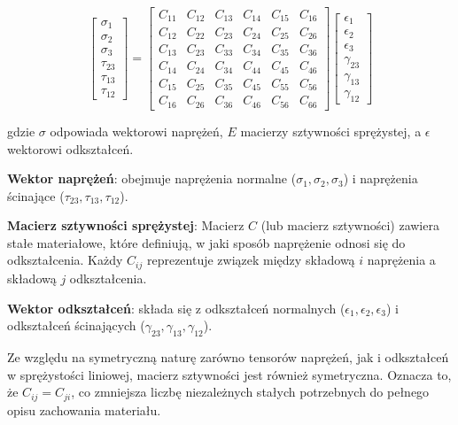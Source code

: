 $$
\begin{bmatrix}
\sigma_1 \\
\sigma_2 \\
\sigma_3 \\
\tau_{23} \\
\tau_{13} \\
\tau_{12}
\end{bmatrix}
=
\begin{bmatrix}
C_{11} & C_{12} & C_{13} & C_{14} & C_{15} & C_{16} \\
C_{12} & C_{22} & C_{23} & C_{24} & C_{25} & C_{26} \\
C_{13} & C_{23} & C_{33} & C_{34} & C_{35} & C_{36} \\
C_{14} & C_{24} & C_{34} & C_{44} & C_{45} & C_{46} \\
C_{15} & C_{25} & C_{35} & C_{45} & C_{55} & C_{56} \\
C_{16} & C_{26} & C_{36} & C_{46} & C_{56} & C_{66}
\end{bmatrix}
\begin{bmatrix}
\epsilon_1 \\
\epsilon_2 \\
\epsilon_3 \\
\gamma_{23} \\
\gamma_{13} \\
\gamma_{12}
\end{bmatrix}
$$

gdzie $\sigma$ odpowiada wektorowi naprężeń, $E$ macierzy sztywności sprężystej, a $\epsilon$ wektorowi odkształceń.

\hspace{1.5cm}  \textbf{Wektor naprężeń}: obejmuje naprężenia normalne ($\sigma_1, \sigma_2, \sigma_3$) i naprężenia ścinające ($\tau_{23}, \tau_{13}, \tau_{12}$).

\hspace{1.5cm}  \textbf{Macierz sztywności sprężystej}: Macierz $C$ (lub macierz sztywności) zawiera stałe materiałowe, które definiują, w jaki sposób naprężenie odnosi się do odkształcenia. Każdy $C_{ij}$ reprezentuje związek między składową $i$ naprężenia a składową $j$ odkształcenia.

\hspace{1.5cm}  \textbf{Wektor odkształceń}: składa się z odkształceń normalnych ($\epsilon_1, \epsilon_2, \epsilon_3$) i odkształceń ścinających ($\gamma_{23}, \gamma_{13}, \gamma_{12}$).

\hspace{1.5cm} Ze względu na symetryczną naturę zarówno tensorów naprężeń, jak i odkształceń w sprężystości liniowej, macierz sztywności jest również symetryczna. Oznacza to, że $C_{ij}=C_{ji}$, co zmniejsza liczbę niezależnych stałych potrzebnych do pełnego opisu zachowania materiału.

